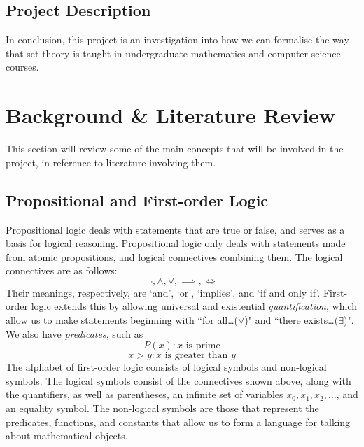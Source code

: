 \documentclass[12pt]{article}
\theoremstyle{definition}
\begin{document}
\subsection{Project Description}
In conclusion, this project is an investigation into how we can formalise the way that set theory is taught in undergraduate mathematics and computer science courses.

\section{Background \& Literature Review}
This section will review some of the main concepts that will be involved in the project, in reference to literature involving them.

\subsection{Propositional and First-order Logic}
Propositional logic deals with statements that are true or false, and serves as a basis for logical reasoning. Propositional logic only deals with statements made from atomic propositions, and logical connectives combining them. The logical connectives are as follows:
$$\neg, \wedge, \vee,\implies,\iff$$
Their meanings, respectively, are `and', `or', `implies', and `if and only if'.
\noindent
First-order logic extends this by allowing universal and existential \emph{quantification}, which allow us to make statements beginning with ``for all\ldots ($\forall$)" and ``there exists\ldots ($\exists$)". We also have \emph{predicates}, such as
$$P(x) : x \text{ is prime}$$
$$ x > y : x \text{ is greater than } y$$
\noindent
The alphabet of first-order logic consists of logical symbols and non-logical symbols.
The logical symbols consist of the connectives shown above, along with the quantifiers, as well as parentheses, an infinite set of variables $x_0, x_1, x_2,\ldots$, and an equality symbol.
The non-logical symbols are those that represent the predicates, functions, and constants that allow us to form a language for talking about mathematical objects.
\end{document}
